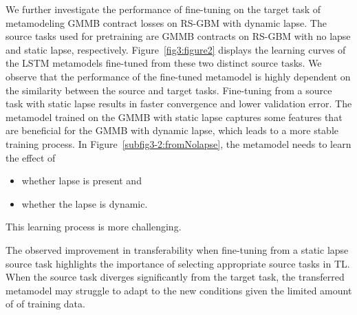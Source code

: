 We further investigate the performance of fine-tuning on the target task of metamodeling GMMB contract losses on RS-GBM with dynamic lapse. 
The source tasks used for pretraining are GMMB contracts on RS-GBM with no lapse and static lapse, respectively. 
Figure~\ref{fig3:figure2} displays the learning curves of the LSTM metamodels fine-tuned from these two distinct source tasks.
We observe that the performance of the fine-tuned metamodel is highly dependent on the similarity between the source and target tasks.
Fine-tuning from a source task with static lapse results in faster convergence and lower validation error.
The metamodel trained on the GMMB with static lapse captures some features that are beneficial for the GMMB with dynamic lapse, which leads to a more stable training process.
In Figure~\ref{subfig3-2:fromNolapse}, the metamodel needs to learn the effect of 
\begin{itemize}
    \item whether lapse is present and
    \item whether the lapse is dynamic.
\end{itemize}
This learning process is more challenging.

The observed improvement in transferability when fine-tuning from a static lapse source task highlights the importance of selecting appropriate source tasks in TL. 
When the source task diverges significantly from the target task, the transferred metamodel may struggle to adapt to the new conditions given the limited amount of of training data.

